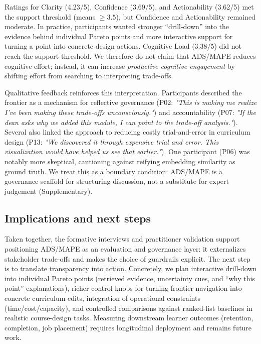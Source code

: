 \documentclass[sigconf,review]{acmart}
\newcommand{\ADS}{\textsc{ADS}\xspace}
\newcommand{\MAPE}{\textsc{MAPE}\xspace}
\begin{document}
Ratings for {Clarity} (4.23/5), {Confidence} (3.69/5), and {Actionability} (3.62/5) met the support threshold (means $\ge 3.5$), but Confidence and Actionability remained moderate. In practice, participants wanted stronger ``drill-down'' into the evidence behind individual Pareto points and more interactive support for turning a point into concrete design actions. {Cognitive Load} (3.38/5) did not reach the support threshold. We therefore do not claim that \ADS/\MAPE reduces cognitive effort; instead, it can increase \emph{productive cognitive engagement} by shifting effort from searching to interpreting trade-offs.

Qualitative feedback reinforces this interpretation. Participants described the frontier as a mechanism for reflective governance (P02: \textit{"This is making me realize I've been making these trade-offs unconsciously."}) and accountability (P07: \textit{"If the dean asks why we added this module, I can point to the trade-off analysis."}). Several also linked the approach to reducing costly trial-and-error in curriculum design (P13: \textit{"We discovered it through expensive trial and error. This visualization would have helped us see that earlier."}). One participant (P06) was notably more skeptical, cautioning against reifying embedding similarity as ground truth. We treat this as a boundary condition: \ADS/\MAPE is a governance scaffold for structuring discussion, not a substitute for expert judgement (Supplementary).

\subsection{Implications and next steps}
Taken together, the formative interviews and practitioner validation support positioning \ADS/\MAPE as an evaluation and governance layer: it externalizes stakeholder trade-offs and makes the choice of guardrails explicit. The next step is to translate transparency into action. Concretely, we plan interactive drill-down into individual Pareto points (retrieved evidence, uncertainty cues, and ``why this point'' explanations), richer control knobs for turning frontier navigation into concrete curriculum edits, integration of operational constraints (time/cost/capacity), and controlled comparisons against ranked-list baselines in realistic course-design tasks. Measuring downstream learner outcomes (retention, completion, job placement) requires longitudinal deployment and remains future work.
\end{document}
